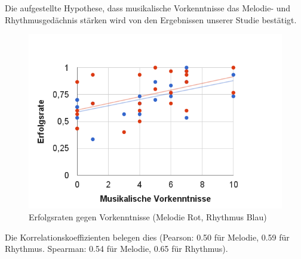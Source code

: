\documentclass{acm_proc_article-sp}
\begin{document}
Die aufgestellte Hypothese, dass musikalische Vorkenntnisse das Melodie- und Rhythmusgedächnis stärken wird von den Ergebnissen unserer Studie bestätigt.
\begin{figure}[H]
\includegraphics[width=1.0\linewidth]{Abbildungen/Einschaetzung-Melodie_Rhythmus.png}
\caption{Erfolgsraten gegen Vorkenntnisse (Melodie Rot, Rhythmus Blau)}
\label{Alter}
\end{figure}
Die Korrelationskoeffizienten belegen dies (Pearson: 0.50 für Melodie, 0.59 für Rhythmus. Spearman: 0.54 für Melodie, 0.65 für Rhythmus).\\\\
\end{document}
